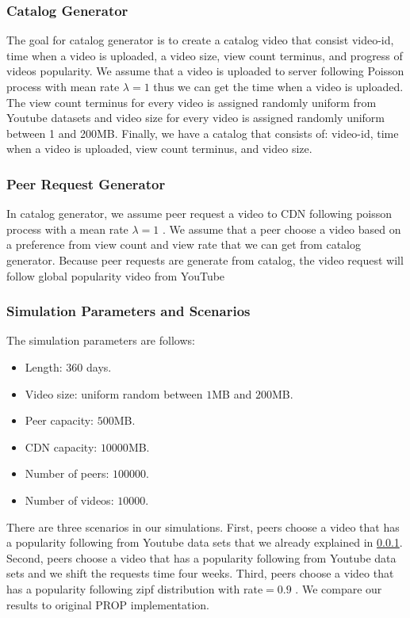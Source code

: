 \subsubsection{Catalog Generator}\label{catalog}
The goal for catalog generator is to create a catalog video that consist video-id, time when a video is uploaded, a video size, view count terminus, and progress of videos popularity. We assume that a video is uploaded to server following Poisson process with mean rate $\lambda=1$ thus we can get the time when a video is uploaded. 
The view count terminus for every video is assigned randomly uniform from Youtube datasets and video size for every video is assigned randomly uniform between 1 and 200MB. Finally, we have a catalog that consists of: video-id, time when a video is uploaded, view count terminus, and video size.

\subsubsection{Peer Request Generator}\label{peerrequest}
In catalog generator, we assume peer request a video to CDN following poisson process with a mean rate $\lambda=1$ \cite{Zink:2009:CYN:1502814.1502987}.
We assume that a peer choose a video based on a preference from view count and view rate that we can get from catalog generator.  
Because peer requests are generate from catalog, the video request will follow global popularity video from YouTube

\subsubsection{Simulation Parameters and Scenarios}
The simulation parameters are follows:

\begin{itemize}
\item Length: $360$ days.
\item Video size: uniform random between $1$MB and $200$MB.
\item Peer capacity: $500$MB.
\item CDN capacity: $10000$MB.
\item Number of peers: $100000$.
\item Number of videos: $10000$.
\end{itemize}

There are three scenarios in our simulations.
First, peers choose a video that has a popularity following from Youtube data sets that we already explained in \ref{catalog}.
Second, peers choose a video that has a popularity following from Youtube data sets and we shift the requests time four weeks.
Third, peers choose a video that has a popularity following zipf distribution with rate$=0.9$ \cite{6654887}.
We compare our results to original PROP \cite{1613869} implementation.




